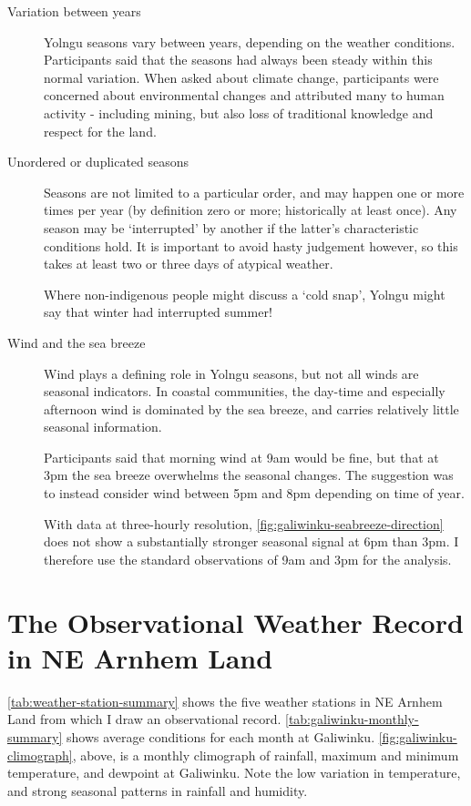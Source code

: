 \begin{description}
\item[Variation between years]
    Yolngu seasons vary between years, depending on the weather conditions.
    Participants said that the seasons had always been steady within this
    normal variation.  When asked about climate change, participants were
    concerned about environmental changes and attributed many to human
    activity - including mining, but also loss of traditional knowledge
    and respect for the land.

\item[Unordered or duplicated seasons]
    Seasons are not limited to a particular order, and may happen one or more
    times per year (by definition zero or more; historically at least once).
    Any season may be `interrupted' by another if the latter's characteristic
    conditions hold.  It is important to avoid hasty judgement however, so this
    takes at least two or three days of atypical weather.  

    Where non-indigenous people might discuss a `cold snap', Yolngu might
    say that winter had interrupted summer!

\item[Wind and the sea breeze] 
    Wind plays a defining role in Yolngu seasons, but not all winds are
    seasonal indicators.  In coastal communities, the day-time and especially
    afternoon wind is dominated by the sea breeze, and carries relatively little
    seasonal information.
    
    Participants said that morning wind at 9am would be fine, but that at
    3pm the sea breeze overwhelms the seasonal changes.  The suggestion was
    to instead consider wind between 5pm and 8pm depending on time of year.
    
    With data at three-hourly resolution, \autoref{fig:galiwinku-seabreeze-direction}
    does not show a substantially stronger seasonal signal at 6pm than 3pm.
    I therefore use the standard observations of 9am and 3pm for the analysis.

\end{description}



\section{The Observational Weather Record in NE Arnhem Land}

\autoref{tab:weather-station-summary} shows the five weather stations in NE
Arnhem Land from which I draw an observational record.
\autoref{tab:galiwinku-monthly-summary} shows average conditions for each
month at Galiwinku.  \autoref{fig:galiwinku-climograph}, above, is a monthly
climograph of rainfall, maximum and minimum temperature, and dewpoint at
Galiwinku.  Note the low variation in temperature, and strong seasonal
patterns in rainfall and humidity.

